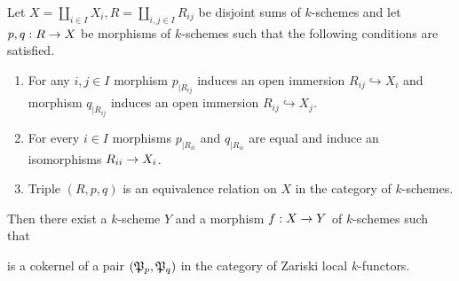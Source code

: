 \begin{lemma}\label{lemma:recollement}
Let $X = \coprod_{i\in I}X_i, R = \coprod_{i,j\in I}R_{ij}$ be disjoint sums of $k$-schemes and let $p,q:R\rightarrow X$ be morphisms of $k$-schemes such that the following conditions are satisfied.
\begin{enumerate}[label=\emph{\textbf{(\arabic*)}}, leftmargin=3.0em]
\item For any $i,j\in I$ morphism $p_{\mid R_{ij}}$ induces an open immersion $R_{ij}\hookrightarrow X_i$ and morphism $q_{\mid R_{ij}}$ induces an open immersion $R_{ij}\hookrightarrow X_j$.
\item For every $i\in I$ morphisms $p_{\mid R_{ii}}$ and $q_{\mid R_{ii}}$ are equal and induce an isomorphisms $R_{ii}\rightarrow X_i$.  
\item Triple $\left(R,p,q\right)$ is an equivalence relation on $X$ in the category of $k$-schemes.
\end{enumerate}
Then there exist a $k$-scheme $Y$ and a morphism $f:X\rightarrow Y$ of $k$-schemes such that
\begin{center}
\end{center}
is a cokernel of a pair $({\mathfrak P}_{p},{\mathfrak P}_{q})$ in the category of Zariski local $k$-functors.
\end{lemma}
